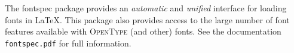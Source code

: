 \documentclass[varwidth, margin=4pt]{standalone}
\begin{document}
\qquad
The \textsf{fontspec} package provides an \emph{automatic} and \emph{unified} interface for loading
fonts in \LaTeX. This package also provides access to the large number of font features available
with \textsc{OpenType} (and other) fonts. See the documentation \texttt{fontspec.pdf} for full
information.
\end{document}
